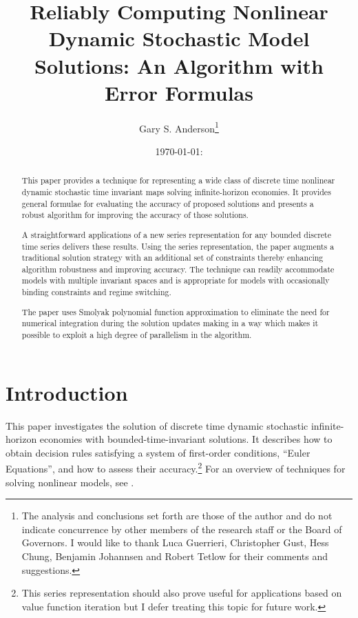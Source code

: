 \documentclass[12pt]{article}
\author{Gary S. Anderson\thanks{The analysis and conclusions set forth are those of the author and do not indicate concurrence by other members of the research staff or the Board of Governors. I would like to thank Luca Guerrieri, Christopher Gust, Hess Chung, Benjamin Johannsen  and Robert Tetlow for their comments and suggestions.  
}}
\title{Reliably Computing
  Nonlinear Dynamic Stochastic Model Solutions: 
An Algorithm with Error Formulas } %
\date{\today: \currenttime}
\begin{document}



\maketitle

\begin{abstract}
This paper provides a technique for representing a wide class of discrete time  nonlinear dynamic stochastic time invariant maps solving infinite-horizon economies.
It provides general
formulae for evaluating the accuracy of proposed solutions
and presents a robust algorithm for improving the accuracy of those solutions.

A straightforward applications of a  new series representation
for any bounded discrete time series delivers these results.
Using the series representation, the paper 
augments a traditional solution strategy with an additional set of
constraints thereby enhancing algorithm robustness and improving accuracy.
The technique can readily accommodate models with multiple invariant spaces
and  is appropriate
for models with occasionally binding constraints and regime switching. 


The  paper uses 
Smolyak polynomial function approximation  
to eliminate the need for numerical integration during the solution updates making in a way which makes it possible to exploit a high degree of parallelism in the algorithm.







\end{abstract}

\newpage
\tableofcontents
\newpage

\section{Introduction}

This paper investigates the solution of discrete time  dynamic stochastic
infinite-horizon economies with bounded-time-invariant solutions.
It describes how to obtain decision rules satisfying a system of 
first-order conditions, ``Euler Equations'',  and how to assess their accuracy.\footnote{This series 
representation should also prove useful for applications based on
value function iteration but I  defer treating this topic for
 future work.
}
 For an overview of techniques for solving nonlinear models,
see \citep{judd92,Christiano2000,doraszelskiy04,gaspar97,Judd2014,marcet.lorenzoni99,juddGSSA2011,maliarmovingbounds,RePEc:bny:wpaper:0058}.
\end{document}
